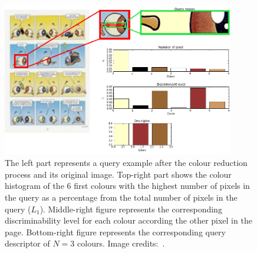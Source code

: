 



 \begin{figure}[!ht]	%
 	 \centering
 	\includegraphics[width=0.9\textwidth]{description_sequence.png}
 	\caption[Comic character query description]{The left part represents a query example after the colour reduction process and its original image. Top-right part shows the colour histogram of the 6 first colours with the highest number of pixels in the query as a percentage from the total number of pixels in the query ($L_1$). Middle-right figure represents the corresponding discriminability level for each colour according the other pixel in the page. Bottom-right figure represents the corresponding query descriptor of $N=3$ colours. Image credits:~\cite{Noeils11}. }
 	\label{fig:in:dominant_colour_hist_desc}
 \end{figure}


